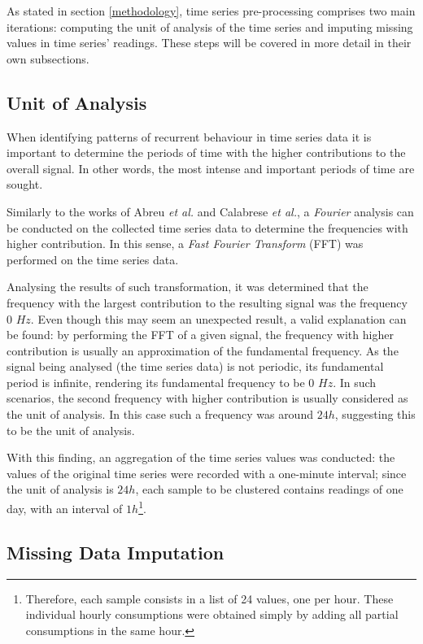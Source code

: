 \documentclass[9pt,journal,compsoc]{IEEEtran}
\begin{document}
As stated in section \ref{methodology}, time series pre-processing comprises two main iterations: computing the unit of analysis of the time series and imputing missing values in time series' readings. These steps will be covered in more detail in their own subsections.

\subsection{Unit of Analysis}

When identifying patterns of recurrent behaviour in time series data it is important to determine the periods of time with the higher contributions to the overall signal. In other words, the most intense and important periods of time are sought.

Similarly to the works of Abreu \emph{et al.}\cite{abreu2012using} and Calabrese \emph{et al.}\cite{calabrese2010eigenplaces}, a \emph{Fourier} analysis can be conducted on the collected time series data to determine the frequencies with higher contribution. In this sense, a \emph{Fast Fourier  Transform} (FFT) was performed on the time series data. 

Analysing the results of such transformation, it was determined that the frequency with the largest contribution to the resulting signal was the frequency 0 $Hz$. Even though this may seem an unexpected result, a valid explanation can be found: by performing the FFT of a given signal, the frequency with higher contribution is usually an approximation of the fundamental frequency. As the signal being analysed (the time series data) is not periodic, its fundamental period is infinite, rendering its fundamental frequency to be 0 $Hz$. In such scenarios, the second frequency with higher contribution is usually considered as the unit of analysis. In this case such a frequency was around $24h$, suggesting this to be the unit of analysis.

With this finding, an aggregation of the time series values was conducted: the values of the original time series were recorded with a one-minute interval; since the unit of analysis is $24h$, each sample to be clustered contains readings of one day, with an interval of $1h$\footnote{Therefore, each sample consists in a list of 24 values, one per hour. These individual hourly consumptions were obtained simply by adding all partial consumptions in the same hour.}.

\subsection{Missing Data Imputation}
\end{document}
